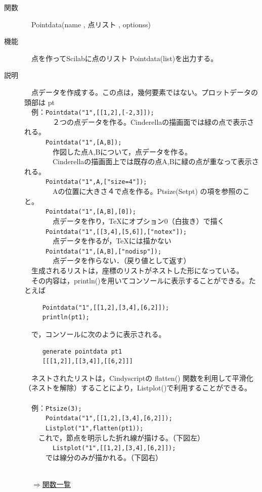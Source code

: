 \documentclass[papersize,a4paper,12pt,uplatex]{jsarticle}
\begin{document}
\begin{description}
\hypertarget{pointdata}{}
\item[関数]　Pointdata(name , 点リスト , optionss)
\item[機能]　点を作ってScilabに点のリスト Pointdata(list)を出力する。
\item[説明]　点データを作成する。この点は，幾何要素ではない。プロットデータの頭部は pt\\
　例：\verb|Pointdata("1",[[1,2],[-2,3]]);|\\
　　　　２つの点データを作る。Cinderellaの描画面では緑の点で表示される。\\
　　　\verb|Pointdata("1",[A,B]);|\\
　　　　作図した点A,Bについて，点データを作る。\\
　　　　Cinderellaの描画面上では既存の点A,Bに緑の点が重なって表示される。\\
　　　\verb|Pointdata("1",A,["size=4"]);|\\
　　　　Aの位置に大きさ４で点を作る。Ptsize(Setpt) の項を参照のこと。\\
　　　\verb|Pointdata("1",[A,B],[0]);|\\
　　　　点データを作り，TeXにオプション0（白抜き）で描く\\
　　　\verb|Pointdata("1",[[3,4],[5,6]],["notex"]);|\\
　　　　点データを作るが，TeXには描かない\\
　　　\verb|Pointdata("1",[A,B],["nodisp"]);|\\
　　　　点データを作らない．（戻り値として返す）\\
 
 　生成されるリストは，座標のリストがネストした形になっている。\\
 　その内容は，println()を用いてコンソールに表示することができる。たとえば
 \begin{verbatim}
　　　Pointdata("1",[[1,2],[3,4],[6,2]]);
　　　println(pt1);
\end{verbatim}
 　で，コンソールに次のように表示される。
\begin{verbatim}
　　　generate pointdata pt1 
　　　[[[1,2]],[[3,4]],[[6,2]]] 
\end{verbatim}
　ネストされたリストは，Cindyscriptの flatten() 関数を利用して平滑化（ネストを解除）することにより，Listplot()で利用することができる。\\
　\\
　例：\verb|Ptsize(3);|\\
　　　\verb|Pointdata("1",[[1,2],[3,4],[6,2]]);|\\
　　　\verb|Listplot("1",flatten(pt1));|\\
　　これで，節点を明示した折れ線が描ける。（下図左）\\
　　　　\verb|Listplot("1",[[1,2],[3,4],[6,2]]);|\\
　　　では線分のみが描かれる。（下図右）\\
 　　　\\
\begin{flushright}　\hyperlink{functionlist}{$\Rightarrow$関数一覧}\end{flushright}


\end{description}
\end{document}

